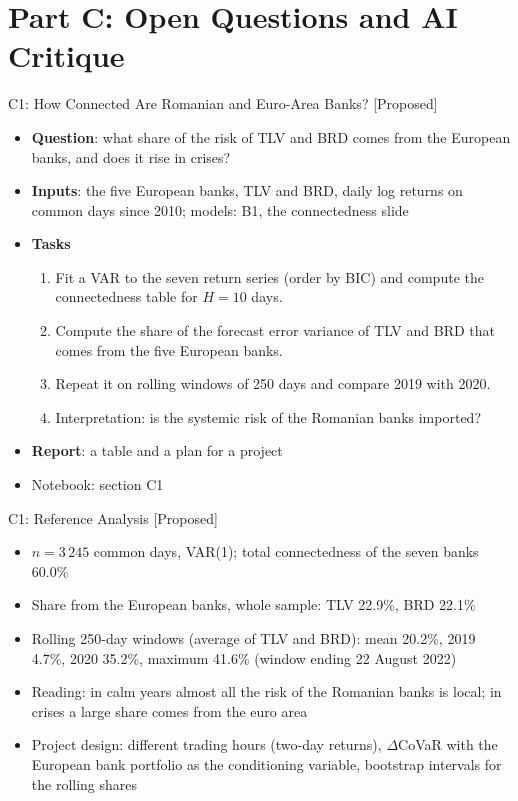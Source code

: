 \section{Part C: Open Questions and AI Critique}

\begin{frame}{C1: How Connected Are Romanian and Euro-Area Banks? [Proposed]}
\itemsize{\footnotesize}
\begin{itemize}
\item \textbf{Question}: what share of the risk of TLV and BRD comes from the European banks, and does it rise in crises?
\item \textbf{Inputs}: the five European banks, TLV and BRD, daily log returns on common days since 2010; models: B1, the connectedness slide
\item \textbf{Tasks}
\begin{enumerate}
    \item Fit a VAR to the seven return series (order by BIC) and compute the connectedness table for $H = 10$ days.
    \item Compute the share of the forecast error variance of TLV and BRD that comes from the five European banks.
    \item Repeat it on rolling windows of 250 days and compare 2019 with 2020.
    \item Interpretation: is the systemic risk of the Romanian banks imported?
\end{enumerate}
\item \textbf{Report}: a table and a plan for a project
\item Notebook: section C1
\end{itemize}
\end{frame}

\ifsolutions
\begin{frame}{C1: Reference Analysis [Proposed]}
\itemsize{\footnotesize}
\begin{itemize}
    \item $n = 3\,245$ common days, VAR(1); total connectedness of the seven banks 60.0\%
    \item Share from the European banks, whole sample: TLV 22.9\%, BRD 22.1\%
    \item Rolling 250-day windows (average of TLV and BRD): mean 20.2\%, 2019 4.7\%, 2020 35.2\%, maximum 41.6\% (window ending 22 August 2022)
    \item Reading: in calm years almost all the risk of the Romanian banks is local; in crises a large share comes from the euro area
    \item Project design: different trading hours (two-day returns), $\Delta$CoVaR with the European bank portfolio as the conditioning variable, bootstrap intervals for the rolling shares
\end{itemize}
\end{frame}
\fi


